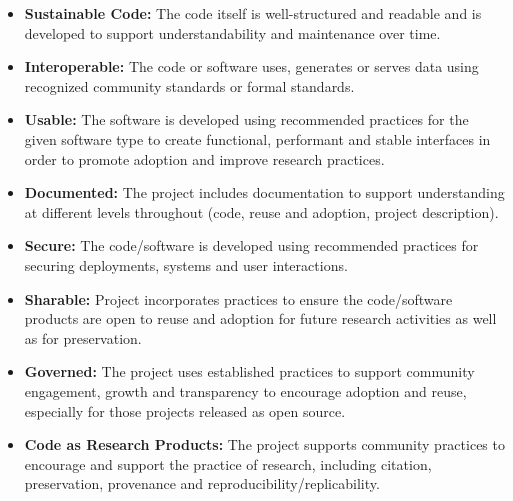 \documentclass{article}
\begin{document}
\begin{itemize}
\item \textbf{Sustainable Code:} The code itself is well-structured and readable and is developed to support understandability and maintenance over time.
\item \textbf{Interoperable:}  The code or software uses, generates or serves data using recognized community standards or formal standards. 
\item \textbf{Usable:} The software is developed using recommended practices for the given software type to create functional, performant and stable interfaces in order to promote adoption and improve research practices. 
\item \textbf{Documented:} The project includes documentation to support understanding at different levels throughout (code, reuse and adoption, project description).
\item \textbf{Secure:} The code/software is developed using recommended practices for securing deployments, systems and user interactions. 
\item \textbf{Sharable:} Project incorporates practices to ensure the code/software products are open to reuse and adoption for future research activities as well as for preservation.
\item \textbf{Governed:} The project uses established practices to support community engagement, growth and transparency to encourage adoption and reuse, especially for those projects released as open source.
\item \textbf{Code as Research Products:} The project supports community practices to encourage and support the practice of research, including citation, preservation, provenance and reproducibility/replicability.
\end{itemize}
 
\end{document}
